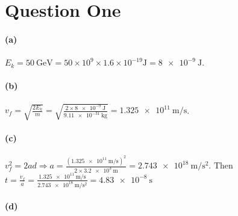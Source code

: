 \documentclass[a4paper]{amsart}
\begin{document}
\section*{Question One}
\paragraph{(a)} $ E_k = \SI{50}{\giga\electronvolt} = 50 \times 10^9 \times 1.6 \times 10^{-19} \si{\joule} = \SI{8e-9}{\joule} $.
\paragraph{(b)} $ v_f = \sqrt{\frac{2E_k}{m}} = \sqrt{\frac{2 \times \SI{8e-9}{\joule}}{\SI{9.11e-31}{\kilo\gram}}} = \SI{1.325e11}{\metre\per\second} $.
\paragraph{(c)} $ v_f^2 = 2ad \Rightarrow a = \frac{(\SI{1.325e11}{\metre\per\second})^2}{2 \times \SI{3.2e3}{\metre}}
                                            = \SI{2.743e18}{\metre\per\second\squared} $. Then $ t = \frac{v_f}{a} = \frac{\SI{1.325e11}{\metre\per\second}}{\SI{2.743e18}{\metre\per\second\squared}} = \SI{4.83e-8}{\second} $
\paragraph{(d)}
\end{document}
